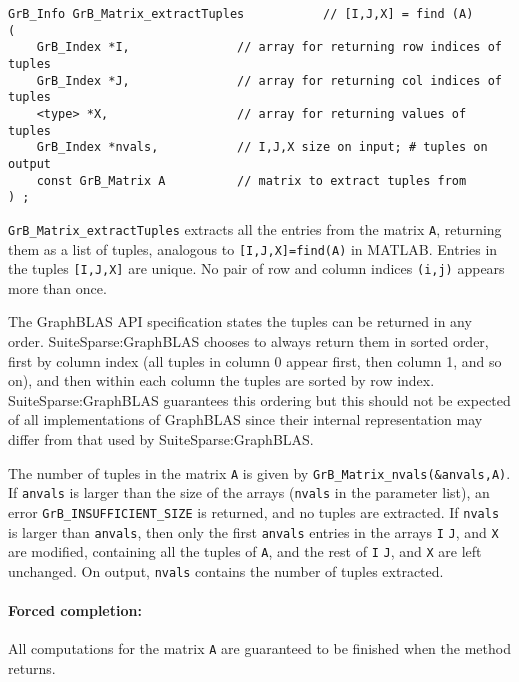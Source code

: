 \documentclass[12pt]{article}
\begin{document}
\begin{mdframed}[userdefinedwidth=6in]
{\footnotesize
\begin{verbatim}
GrB_Info GrB_Matrix_extractTuples           // [I,J,X] = find (A)
(
    GrB_Index *I,               // array for returning row indices of tuples
    GrB_Index *J,               // array for returning col indices of tuples
    <type> *X,                  // array for returning values of tuples
    GrB_Index *nvals,           // I,J,X size on input; # tuples on output
    const GrB_Matrix A          // matrix to extract tuples from
) ;
\end{verbatim} } \end{mdframed}

\verb'GrB_Matrix_extractTuples' extracts all the entries from the matrix
\verb'A', returning them as a list of tuples, analogous to
\verb'[I,J,X]=find(A)' in MATLAB.  Entries in the tuples \verb'[I,J,X]' are
unique.  No pair of row and column indices \verb'(i,j)' appears more than once.

The GraphBLAS API specification states the tuples can be returned in any order.
SuiteSparse:GraphBLAS chooses to always return them in sorted order, first by
column index (all tuples in column 0 appear first, then column 1, and so on),
and then within each column the tuples are sorted by row index.
SuiteSparse:GraphBLAS guarantees this ordering but this should not be expected
of all implementations of GraphBLAS since their internal representation may
differ from that used by SuiteSparse:GraphBLAS.

The number of tuples in the matrix \verb'A' is given by
\verb'GrB_Matrix_nvals(&anvals,A)'.  If \verb'anvals' is larger than the size
of the arrays (\verb'nvals' in the parameter list), an error
\verb'GrB_INSUFFICIENT_SIZE' is returned, and no tuples are extracted.  If
\verb'nvals' is larger than \verb'anvals', then only the first \verb'anvals'
entries in the arrays \verb'I' \verb'J', and \verb'X' are modified, containing
all the tuples of \verb'A', and the rest of \verb'I' \verb'J', and \verb'X' are
left unchanged.
On output, \verb'nvals' contains the number of tuples extracted.

\paragraph{Forced completion:}
All computations for the matrix \verb'A' are
guaranteed to be finished when the method returns.


\end{document}
